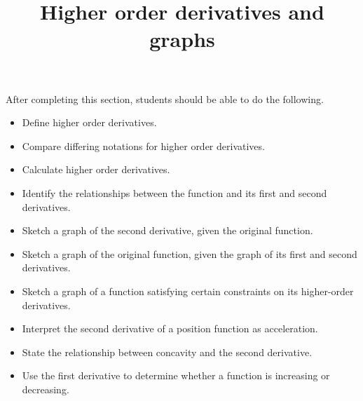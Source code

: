 \documentclass{ximera}
\title{Higher order derivatives and graphs}
\begin{document}
\begin{abstract}
\end{abstract}

\maketitle

\begin{sectionOutcomes}

After completing this section, students should be able to do the following.

\begin{itemize}
	\item Define higher order derivatives.
        \item Compare differing notations for higher order derivatives.
	\item Calculate higher order derivatives.
	\item Identify the relationships between the function and its first and second derivatives.
	\item Sketch a graph of the second derivative, given the original function.
	\item Sketch a graph of the original function, given the graph of its first and second derivatives.
        \item Sketch a graph of a function satisfying certain constraints on its higher-order derivatives.
	\item Interpret the second derivative of a position function as acceleration.
	\item State the relationship between concavity and the second derivative.
	\item Use the first derivative to determine whether a function is increasing or decreasing.
\end{itemize}

\end{sectionOutcomes}
\end{document}

